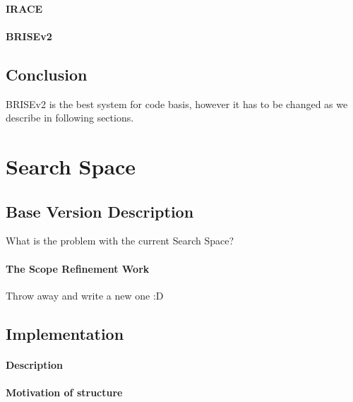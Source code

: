 \paragraph{IRACE}
\paragraph{BRISEv2}

\subsection{Conclusion}
BRISEv2 is the best system for code basis, however it has to be changed as we describe in following sections.


\section{Search Space}\label{implementation: search space}

\subsection{Base Version Description}
What is the problem with the current Search Space?
\paragraph{The Scope Refinement Work} Throw away and write a new one :D

\subsection{Implementation}
\paragraph{Description}
\paragraph{Motivation of structure}
